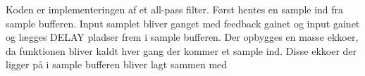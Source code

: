 Koden er implementeringen af et all-pass filter.
Først hentes en sample ind fra sample bufferen.
Input samplet bliver ganget med feedback gainet og input gainet og lægges DELAY pladser frem i sample bufferen.\newline
Der opbygges en masse ekkoer, da funktionen bliver kaldt hver gang der kommer et sample ind.\newline
Disse ekkoer der ligger på i sample bufferen bliver lagt sammen med 

